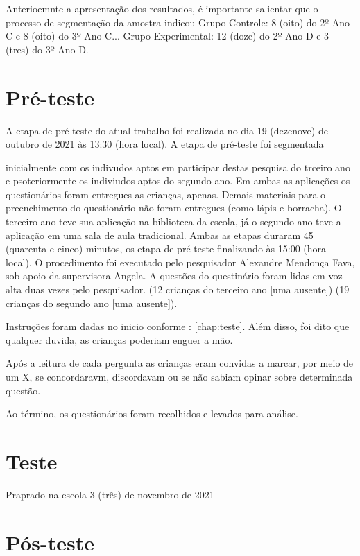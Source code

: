Anterioemnte a apresentação dos resultados, é importante salientar que o processo de segmentação da amostra indicou Grupo Controle: 8 (oito) do 2º Ano C e 8 (oito) do 3º Ano C... Grupo Experimental: 12 (doze) do 2º Ano D e 3 (tres) do 3º Ano D.


\section{Pré-teste}\label{sec:pretes}

A etapa de pré-teste do atual trabalho foi realizada no dia 19 (dezenove) de outubro de 2021 às 13:30 (hora local). A etapa de pré-teste foi segmentada 

inicialmente com os indivudos aptos em participar destas pesquisa do trceiro ano e psoteriormente os indiviudos aptos do segundo ano. Em ambas as aplicações os questionários foram entregues as crianças, apenas. Demais materiais para o preenchimento do questionário não foram entregues (como lápis e borracha). O terceiro ano teve sua aplicação na biblioteca da escola, já o segundo ano teve a aplicação em uma sala de aula tradicional. Ambas as etapas duraram 45 (quarenta e cinco) minutos, os etapa de pré-teste finalizando às 15:00 (hora local). O procedimento foi executado pelo pesquisador Alexandre Mendonça Fava, sob apoio da supervisora Angela. A questões do questinário foram lidas em voz alta duas vezes pelo pesquisador. (12 crianças do terceiro ano [uma ausente]) (19 crianças do segundo ano [uma ausente]). 

Instruções foram dadas no inicio conforme : \autoref{chap:teste}. Além disso, foi dito que qualquer duvida, as crianças poderiam enguer a mão. 

Após a leitura de cada pergunta as crianças eram convidas a marcar, por meio de um X, se concordaravm, discordavam ou se não sabiam opinar sobre determinada questão. 


Ao término, os questionários foram recolhidos e levados para análise. 



\section{Teste}\label{sec:tes}

Praprado na escola 3 (três) de novembro de 2021

\section{Pós-teste}\label{sec:postes}


